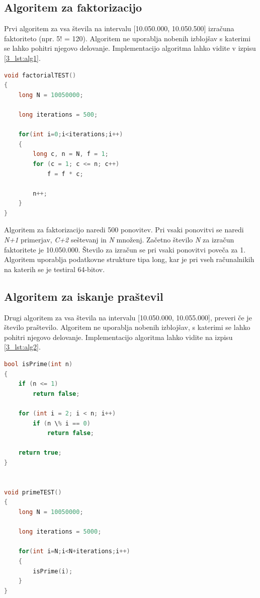\subsection{Algoritem za faktorizacijo}

Prvi algoritem za vsa števila na intervalu [10.050.000, 10.050.500] izračuna faktoriteto (npr. 5! = 120). Algoritem ne uporablja nobenih izblojšav s katerimi se lahko pohitri njegovo delovanje. Implementacijo algoritma lahko vidite v izpisu \ref{3_lst:alg1}.

\begin{lstlisting}[language=C++, caption=Algoritem računanja faktoritele, label={3_lst:alg1},captionpos=b]
void factorialTEST()
{
    long N = 10050000;

    long iterations = 500;

	for(int i=0;i<iterations;i++)
	{
		long c, n = N, f = 1;
		for (c = 1; c <= n; c++)
			f = f * c;

		n++;
	}
}
\end{lstlisting} 

Algoritem za faktorizacijo naredi 500 ponovitev. Pri vsaki ponovitvi se naredi \textit{N+1} primerjav, \textit{C+2} seštevanj in \textit{N} množenj. Začetno število \textit{N} za izračun faktoritete je 10.050.000. Število za izračun se pri vsaki ponovitvi poveča za 1. Algoritem uporablja podatkovne strukture tipa long, kar je pri vseh računalnikih na katerih se je testiral 64-bitov. 

\subsection{Algoritem za iskanje praštevil}

Drugi algoritem za vsa števila na intervalu [10.050.000, 10.055.000], preveri če je število praštevilo. Algoritem ne uporablja nobenih izblojšav, s katerimi se lahko pohitri njegovo delovanje. Implementacijo algoritma lahko vidite na izpisu \ref{3_lst:alg2}.

\begin{lstlisting}[language=C++, caption=Algoritem za iskanje praštevil, label={3_lst:alg2},captionpos=b]
bool isPrime(int n)
{
    if (n <= 1)
        return false;

    for (int i = 2; i < n; i++)
        if (n \% i == 0)
            return false;

    return true;
}


void primeTEST()
{
	long N = 10050000;

	long iterations = 5000;

	for(int i=N;i<N+iterations;i++)
	{
		isPrime(i);
	}
}
\end{lstlisting} 


